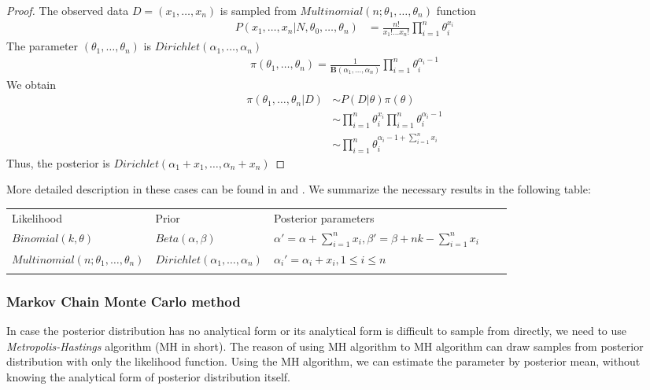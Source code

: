 \documentclass[12pt]{article}
\theoremstyle{definition}
\begin{document}
\begin{proof}
  The observed data $D=(x_1,\ldots,x_n)$ is sampled from $Multinomial(n; \theta_1,\ldots,\theta_n)$ function
  \begin{align*}
    P(x_1,\ldots,x_n | N, \theta_0,\ldots,\theta_n) &= \frac{n!}{x_1!\ldots x_n!} \prod_{i=1}^n\theta_i^{x_i}
  \end{align*}
  The parameter $(\theta_1,\ldots,\theta_n)$ is
  $Dirichlet(\alpha_1,\ldots,\alpha_n)$
  \begin{align*}
    \pi(\theta_1,\ldots,\theta_n) = \frac{1}{\mathbf{B}(\alpha_1,\ldots,\alpha_n)}\prod_{i=1}^n\theta_i^{\alpha_i - 1}
  \end{align*}
  We obtain
  \begin{align*}
    \pi(\theta_1,\ldots,\theta_n|D) &\sim P(D|\theta)\pi(\theta) \\
                                    &\sim \prod_{i=1}^n\theta_i^{x_i} \prod_{i=1}^n\theta_i^{\alpha_i - 1} \\
                                    &\sim \prod_{i=1}^n\theta_i^{\alpha_i - 1 + \sum_{i=1}^n x_i}
  \end{align*}
  Thus, the posterior is $Dirichlet(\alpha_1 +  x_1,\ldots,\alpha_n
  +  x_n)$
\end{proof}
More detailed description in these cases can be found in \cite{tu2014dirichlet}
and \cite{baron2019probability}. We summarize the necessary results in the following table:
\begin{table}[H]
\begin{tabular}{lllll}
\cline{1-3}
\multicolumn{1}{|l|}{Likelihood} & \multicolumn{1}{l|}{Prior} & \multicolumn{1}{l|}{Posterior parameters} &  &  \\ \cline{1-3}
  \multicolumn{1}{|l|}{$Binomial(k, \theta)$}  & \multicolumn{1}{l|}{$Beta(\alpha, \beta)$}  & \multicolumn{1}{l|}{$\alpha' = \alpha + \sum_{i=1}^n x_i, \beta' = \beta + nk -\sum_{i=1}^n x_i$}  &  &  \\ \cline{1-3}
  \multicolumn{1}{|l|}{$Multinomial(n; \theta_1,\ldots,\theta_n)$}  & \multicolumn{1}{l|}{$Dirichlet(\alpha_1,\ldots,\alpha_n)$}  & \multicolumn{1}{l|}{$\alpha_i' =\alpha_i + x_i, 1 \leq i \leq n$}  &  &  \\ \cline{1-3}
                        &                        &                        &  & 
\end{tabular}
\end{table}

\subsubsection{Markov Chain Monte Carlo method}
In case the posterior distribution has no analytical form or its analytical form
is difficult to sample from directly, we need to use
\textit{Metropolis-Hastings} algorithm (MH in short). The reason of using MH
algorithm to MH algorithm can draw samples from posterior distribution with only
the likelihood function. Using the MH algorithm, we can estimate the parameter
by posterior mean, without knowing the analytical form of posterior distribution
itself.
\end{document}
